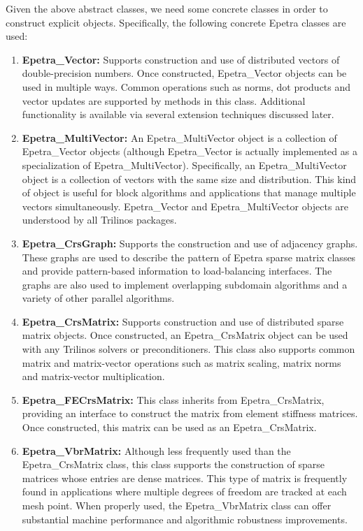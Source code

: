 \documentclass[12pt,relax]{AztecOOUserGuide}
\renewcommand{\vector}{Epetra\_Vector}
\newcommand{\multivector}{Epetra\_MultiVector}
\newcommand{\crsgraph}{Epetra\_CrsGraph}
\newcommand{\crsmatrix}{Epetra\_CrsMatrix}
\newcommand{\vbrmatrix}{Epetra\_VbrMatrix}
\newcommand{\fecrsmatrix}{Epetra\_FE\-Crs\-Matrix}
\begin{document}
Given the above abstract classes, we need some concrete classes in
order to construct explicit objects.  Specifically,
the following concrete Epetra classes are used:
\begin{enumerate}
\item {\bf \vector{}: } Supports construction and use of distributed
vectors of double-precision numbers.  Once constructed, \vector{}
objects can be used in multiple ways.  Common operations such as
norms, dot products and vector updates are supported by methods in
this class.  Additional functionality is available via several
extension techniques discussed later.
\item{\bf \multivector{}: } An \multivector{} object is a collection
of \vector{} objects (although \vector{} is actually implemented as a
specialization of \multivector{}).  Specifically, an \multivector{}
object is a collection of vectors with the same size and
distribution.  This kind of object is useful for block algorithms and
applications that manage multiple vectors simultaneously.  \vector{}
and \multivector{} objects are understood by all Trilinos packages.
\item{\bf \crsgraph{}:} Supports the construction and use of adjacency
graphs.  These graphs are used to describe the pattern of Epetra
sparse matrix classes and provide pattern-based information to
load-balancing interfaces.  The graphs are also used to implement
overlapping subdomain algorithms and a variety of other parallel
algorithms.
\item{\bf \crsmatrix{}:} Supports construction and use of distributed
sparse matrix objects.  Once constructed, an \crsmatrix{} object can
be used with any Trilinos solvers or preconditioners.  This class also
supports common matrix and matrix-vector operations such as matrix
scaling, matrix norms and matrix-vector multiplication.
\item{\bf \fecrsmatrix{}:} This class inherits from \crsmatrix,
providing an interface to construct the matrix from element stiffness
matrices.  Once constructed, this matrix can be used as an \crsmatrix{}.
\item{\bf \vbrmatrix{}:} Although less frequently used than the
\crsmatrix{} class, this class supports the construction of sparse
matrices whose entries are dense matrices.  This type of matrix is
frequently found in applications where multiple degrees of freedom are
tracked at each mesh point.  When properly used, the \vbrmatrix{}
class can offer substantial machine performance and algorithmic
robustness improvements.

\end{enumerate}
\end{document}
